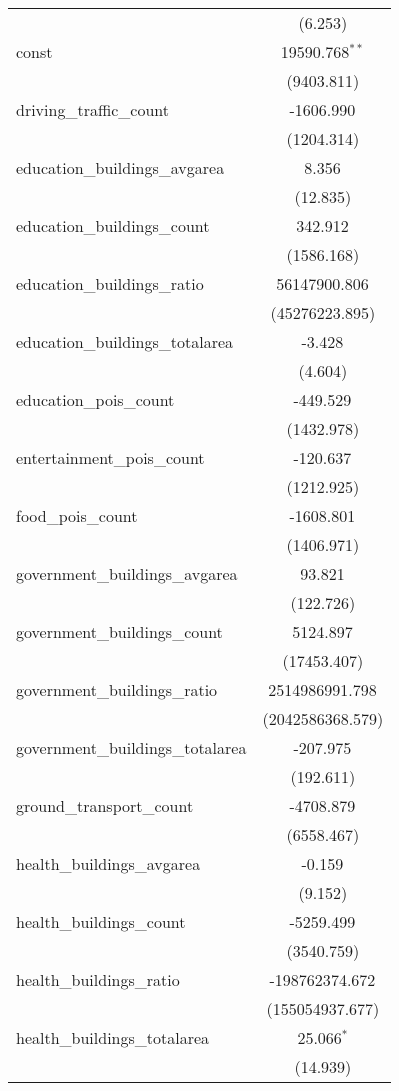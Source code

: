 \begin{table}[!htbp]
\begin{tabular}{@{\extracolsep{5pt}}lc}
  & (6.253) \\
 const & 19590.768$^{**}$ \\
  & (9403.811) \\
 driving_traffic_count & -1606.990$^{}$ \\
  & (1204.314) \\
 education_buildings_avgarea & 8.356$^{}$ \\
  & (12.835) \\
 education_buildings_count & 342.912$^{}$ \\
  & (1586.168) \\
 education_buildings_ratio & 56147900.806$^{}$ \\
  & (45276223.895) \\
 education_buildings_totalarea & -3.428$^{}$ \\
  & (4.604) \\
 education_pois_count & -449.529$^{}$ \\
  & (1432.978) \\
 entertainment_pois_count & -120.637$^{}$ \\
  & (1212.925) \\
 food_pois_count & -1608.801$^{}$ \\
  & (1406.971) \\
 government_buildings_avgarea & 93.821$^{}$ \\
  & (122.726) \\
 government_buildings_count & 5124.897$^{}$ \\
  & (17453.407) \\
 government_buildings_ratio & 2514986991.798$^{}$ \\
  & (2042586368.579) \\
 government_buildings_totalarea & -207.975$^{}$ \\
  & (192.611) \\
 ground_transport_count & -4708.879$^{}$ \\
  & (6558.467) \\
 health_buildings_avgarea & -0.159$^{}$ \\
  & (9.152) \\
 health_buildings_count & -5259.499$^{}$ \\
  & (3540.759) \\
 health_buildings_ratio & -198762374.672$^{}$ \\
  & (155054937.677) \\
 health_buildings_totalarea & 25.066$^{*}$ \\
  & (14.939) \\

\end{tabular}
\end{table}
